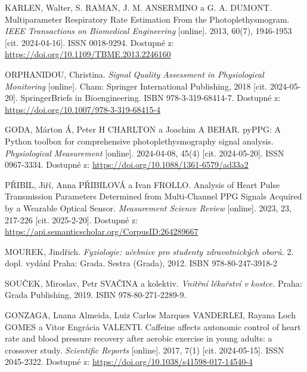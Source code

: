 \begin{thebibliography}{99}
		KARLEN, Walter, S. RAMAN, J. M. ANSERMINO a G. A. DUMONT.
		Multiparameter Respiratory Rate Estimation From the Photoplethysmogram.
		\emph{IEEE Transactions on Biomedical Engineering} [online].
		2013, 60(7), 1946-1953 [cit. 2024-04-16].
		ISSN 0018-9294.
		Dostupné z: \url{https://doi.org/10.1109/TBME.2013.2246160}

		ORPHANIDOU, Christina.
		\emph{Signal Quality Assessment in Physiological Monitoring} [online].
		Cham: Springer International Publishing, 2018 [cit. 2024-05-20].
		SpringerBriefs in Bioengineering.
		ISBN 978-3-319-68414-7.
		Dostupné z: \url{https://doi.org/10.1007/978-3-319-68415-4}

		GODA, Márton Á, Peter H CHARLTON a Joachim A BEHAR.
		pyPPG: A Python toolbox for comprehensive photoplethysmography signal analysis.
		\emph{Physiological Measurement} [online].
		2024-04-08, 45(4) [cit. 2024-05-20].
		ISSN 0967-3334.
		Dostupné z: \url{https://doi.org/10.1088/1361-6579/ad33a2}

		PŘIBIL, Jiří, Anna PŘIBILOVÁ a Ivan FROLLO.
		Analysis of Heart Pulse Transmission Parameters Determined from Multi-Channel PPG Signals Acquired by a Wearable Optical Sensor.
		\emph{Measurement Science Review} [online].
		2023, 23, 217-226 [cit. 2025-2-20].
		Dostupné z: \url{https://api.semanticscholar.org/CorpusID:264289667}

		MOUREK, Jindřich.
		\emph{Fyziologie: učebnice pro studenty zdravotnických oborů.}
		2.\, dopl. vydání Praha: Grada. Sestra (Grada), 2012.
		ISBN 978-80-247-3918-2

		SOUČEK, Miroslav, Petr SVAČINA a kolektiv.
		\emph{Vnitřní lékařství v kostce.}
		Praha: Grada Publishing, 2019.
		ISBN 978-80-271-2289-9.

		GONZAGA, Luana Almeida, Luiz Carlos Marques VANDERLEI, Rayana Loch GOMES a Vitor Engrácia VALENTI.
		Caffeine affects autonomic control of heart rate and blood pressure recovery after aerobic exercise in young adults: a crossover study.
		\emph{Scientific Reports} [online].
		2017, 7(1) [cit. 2024-05-15].
		ISSN 2045-2322.
		Dostupné z: \url{https://doi.org/10.1038/s41598-017-14540-4}


\end{thebibliography}
